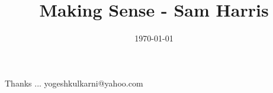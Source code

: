 \documentclass[xcolor=dvipsnames,compress,t,pdf]{beamer}
\title[Making Sense\hspace{4cm} \insertframenumber /\inserttotalframenumber]
{Making Sense - Sam Harris}
\subtitle[]{}
\date[2019]{\today}
\begin{document}
\begin{frame}
\titlepage
\end{frame}




\begin{frame}[c]{}
Thanks ...
\vspace{5mm}
yogeshkulkarni@yahoo.com
\end{frame}
\end{document}

